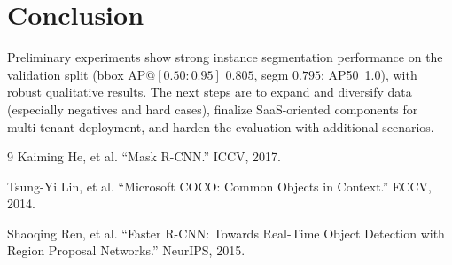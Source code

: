 \documentclass[11pt,a4paper]{article}
\begin{document}
\section{Conclusion}
Preliminary experiments show strong instance segmentation performance on the validation split (bbox AP@\([0.50:0.95]\) \(0.805\), segm \(0.795\); AP50~1.0), with robust qualitative results. The next steps are to expand and diversify data (especially negatives and hard cases), finalize SaaS-oriented components for multi-tenant deployment, and harden the evaluation with additional scenarios.


\begin{thebibliography}{9}
Kaiming He, et al. “Mask R-CNN.” ICCV, 2017.

Tsung-Yi Lin, et al. “Microsoft COCO: Common Objects in Context.” ECCV, 2014.

Shaoqing Ren, et al. “Faster R-CNN: Towards Real-Time Object Detection with Region Proposal Networks.” NeurIPS, 2015.
\end{thebibliography}
\end{document}
